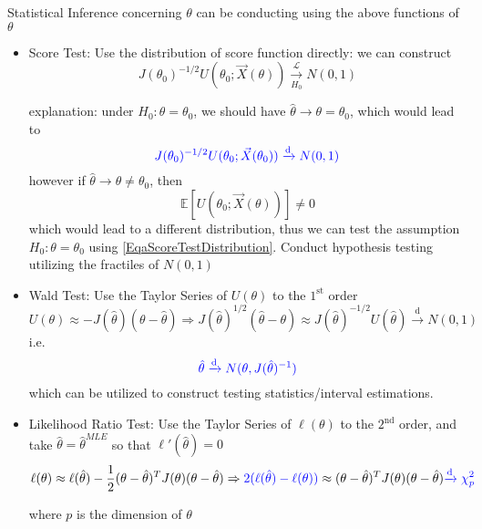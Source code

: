 Statistical Inference concerning $ \theta  $ can be conducting using the above functions of $ \theta  $
\begin{itemize}[topsep=2pt,itemsep=0pt]
    \item {\color{blue}Score Test}: Use the distribution of score function directly: we can construct 
    \begin{equation}\label{EqaScoreTestDistribution}
        J(\theta _0)^{-1/2}U(\theta _0;\vec{X}(\theta )) \xrightarrow[H_0]{\mathscr{L}} N(0,1)
    \end{equation}    
    
    explanation: under $ H_0: \theta =\theta _0 $, we should have $ \hat{\theta }\to \theta =\theta _0 $, which would lead to 
    \begin{equation}
        {\color{blue}J(\theta _0)^{-1/2}U(\theta _0;\vec{X}(\theta_0 ))\xrightarrow[]{\mathrm{d}} N(0,1) }
    \end{equation}
    however if $ \hat{\theta }\to \theta \neq \theta _0  $, then 
    \begin{equation}
        \mathbb{E}\left[U(\theta_0 ;\vec{X}(\theta ))\right]\neq 0 
    \end{equation}
    which would lead to a different distribution, thus we can test the assumption $ H_0:\theta =\theta _0 $ using \autoref{EqaScoreTestDistribution}. Conduct hypothesis testing utilizing the fractiles of $ N(0,1) $
    
    \item {\color{blue}Wald Test}: Use the Taylor Series of $ U(\theta ) $ to the $ 1^\mathrm{st}  $ order
    \begin{equation}
        U(\theta )\approx  -J(\hat{\theta })(\theta -\hat{\theta } )\Rightarrow J(\hat{\theta })^{1/2}(\hat{\theta }-\theta )\approx J(\hat{\theta })^{-1/2}U(\hat{\theta }) \xrightarrow[]{\mathrm{d}} N(0,1)
    \end{equation}
    i.e.
    \begin{equation}
        {\color{blue}\hat{\theta }\xrightarrow[]{\mathrm{d}} N(\theta ,J(\hat{\theta })^{-1}) }
    \end{equation}
    which can be utilized to construct testing statistics/interval estimations.

    \item {\color{blue}Likelihood Ratio Test}: Use the Taylor Series of $ \ell(\theta ) $ to the $ 2^{\mathrm{nd} } $ order, and take $ \hat{\theta }=\hat{\theta }^{MLE} $ so that $ \ell'(\hat{\theta })=0 $
    \begin{equation}
        \ell(\theta )\approx \ell(\hat{\theta })-\dfrac{1}{2}(\theta -\hat{\theta })^TJ(\theta )(\theta -\hat{\theta })\Rightarrow{\color{blue} 2(\ell(\hat{\theta })-\ell(\theta ))}\approx (\theta -\hat{\theta })^TJ(\theta )(\theta -\hat{\theta }){\color{blue}\xrightarrow[]{\mathrm{d}} \chi^2_p}
    \end{equation}

    where $ p $ is the dimension of $ \theta  $    
\end{itemize}

